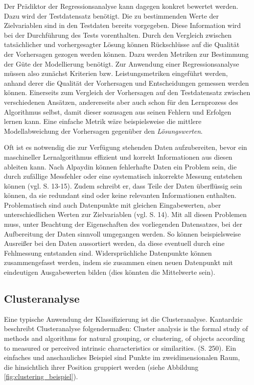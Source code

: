 \documentclass[
	12pt,
	a4paper,
	BCOR10mm,
	DIV14,
	listof=totoc,
	bibliography=totoc,
	headsepline
]{scrreprt}
\begin{document}
Der Prädiktor der Regressionsanalyse kann dagegen konkret bewertet werden. Dazu wird der Testdatensatz benötigt. Die zu bestimmenden Werte der Zielvariablen sind in den Testdaten bereits vorgegeben.
Diese Information wird bei der Durchführung des Tests vorenthalten. Durch den Vergleich zwischen tatsächlicher und vorhergesagter Lösung können Rückschlüsse auf die Qualität der Vorhersagen gezogen werden können. Dazu werden Metriken zur Bestimmung der Güte der Modellierung benötigt.
Zur Anwendung einer Regressionsanalyse müssen also zunächst Kriterien bzw. Leistungsmetriken eingeführt werden, anhand derer die Qualität der Vorhersagen und Entscheidungen gemessen werden können. Einerseits zum Vergleich der Vorhersagen auf den Testdatensatz zwischen verschiedenen Ansätzen, andererseits aber auch schon für den Lernprozess des Algorithmus selbst, damit dieser sozusagen aus seinen Fehlern und Erfolgen lernen kann. Eine einfache Metrik wäre beispielsweise die mittlere Modellabweichung der Vorhersagen gegenüber den \textit{Lösungswerten}.
\medskip

Oft ist es notwendig die zur Verfügung stehenden Daten aufzubereiten, bevor ein maschineller Lernalgorithmus effizient und korrekt Informationen aus diesen ableiten kann.
Nach Alpaydin können fehlerhafte Daten ein Problem sein, die durch zufällige Messfehler oder eine systematisch inkorrekte Messung entstehen können (vgl. \cite{Alpaydin:2010:IML:1734076} S. 13-15). Zudem schreibt er, dass Teile der Daten überflüssig sein können, da sie redundant sind oder keine relevanten Informationen enthalten. Problematisch sind auch Datenpunkte mit gleichen Eingabewerten, aber unterschiedlichen Werten zur Zielvariablen (vgl. \cite{Alpaydin:2010:IML:1734076} S. 14).
Mit all diesen Problemen muss, unter Beachtung der Eigenschaften des vorliegenden Datensatzes, bei der Aufbereitung der Daten sinnvoll umgegangen werden. So können beispielsweise Ausreißer bei den Daten aussortiert werden, da diese eventuell durch eine Fehlmessung entstanden sind. Widersprüchliche Datenpunkte können zusammengefasst werden, indem sie zusammen einen neuen Datenpunkt mit eindeutigen Ausgabewerten bilden (dies könnten die Mittelwerte sein).

\subsection{Clusteranalyse}
Eine typische Anwendung der Klassifizierung ist die Clusteranalyse.
Kantardzic beschreibt Clusteranalyse folgendermaßen: \glqq Cluster analysis is the formal study of methods and algorithms for natural grouping, or clustering, of objects according to measured or perceived intrinsic characteristics or similarities.\grqq{} \cite{kantardzic2011data} (S. 250). Ein einfaches und anschauliches Beispiel sind Punkte im zweidimensionalen Raum, die hinsichtlich ihrer Position gruppiert werden (siehe Abbildung \ref{fig:clustering_beispiel}).
\end{document}
